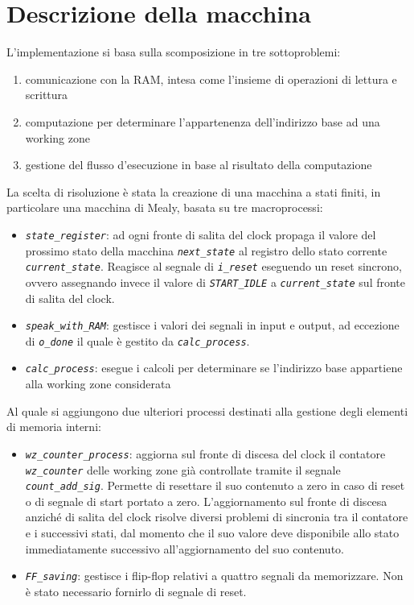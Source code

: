 \documentclass[12pt,a4paper,titlepage]{article}
\begin{document}
	\section{Descrizione della macchina}
		L'implementazione si basa sulla scomposizione in tre sottoproblemi:
		\begin{enumerate}
			\item comunicazione con la RAM, intesa come l'insieme di operazioni di lettura e scrittura
			\item computazione per determinare l'appartenenza dell'indirizzo base ad una working zone
			\item gestione del flusso d'esecuzione in base al risultato della computazione
		\end{enumerate}
		La scelta di risoluzione è stata la creazione di una macchina a stati finiti, in particolare una macchina di Mealy, basata su tre macroprocessi:
		\begin{itemize}
			\item \textit{\texttt{state\_register}}: ad ogni fronte di salita del clock propaga il valore del prossimo stato della macchina \textit{\texttt{next\_state}} al registro dello stato corrente \textit{\texttt{current\_state}}. Reagisce al segnale di \textit{\texttt{i\_reset}} eseguendo un reset sincrono, ovvero assegnando invece il valore di \textit{\texttt{START\_IDLE}} a \textit{\texttt{current\_state}} sul fronte di salita del clock.
			\item \textit{\texttt{speak\_with\_RAM}}: gestisce i valori dei segnali in input e output, ad eccezione di \textit{\texttt{o\_done}} il quale è gestito da \textit{\texttt{calc\_process}}.
			\item \textit{\texttt{calc\_process}}: esegue i calcoli per determinare se l'indirizzo base appartiene alla working zone considerata
		\end{itemize}
		Al quale si aggiungono due ulteriori processi destinati alla gestione degli elementi di memoria interni:
		\begin{itemize}
			\item \textit{\texttt{wz\_counter\_process}}: aggiorna sul fronte di discesa del clock il contatore \textit{\texttt{wz\_counter}} delle working zone già controllate tramite il segnale \textit{\texttt{count\_add\_sig}}. Permette di resettare il suo contenuto a zero in caso di reset o di segnale di start portato a zero. L'aggiornamento sul fronte di discesa anziché di salita del clock risolve diversi problemi di sincronia tra il contatore e i successivi stati, dal momento che il suo valore deve disponibile allo stato immediatamente successivo all'aggiornamento del suo contenuto.
			\item \textit{\texttt{FF\_saving}}: gestisce i flip-flop relativi a quattro segnali da memorizzare. Non è stato necessario fornirlo di segnale di reset.
		\end{itemize}
		
\end{document}
